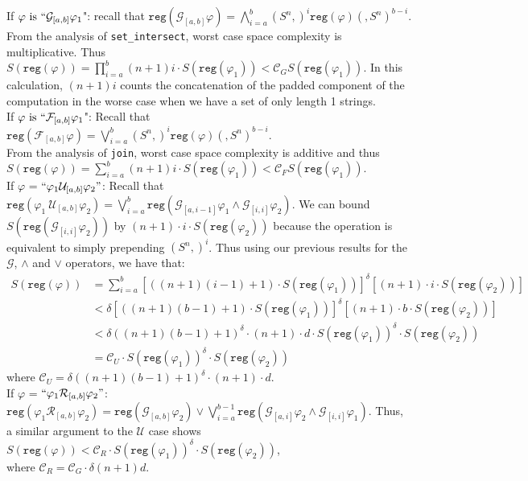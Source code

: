 \documentclass[runningheads]{llncs}
\renewcommand{\phi}{\varphi}
\begin{document}
\begin{flushleft}
\hspace{3mm} If $\phi \text{ is } ``\mathcal{G}_{[a,b]} \phi_{1}$":
recall that $\texttt{reg}(\mathcal{G}_{[a,b]} \phi) = \bigwedge_{i=a}^{b} (S^n,)^i \texttt{reg}(\phi) (,S^n)^{b-i}$.
From the analysis of \texttt{set\_intersect}, worst case space complexity is multiplicative. Thus\\ $S(\texttt{reg}(\phi)) = \prod_{i=a}^{b} (n+1)i \cdot S(\texttt{reg}(\phi_{1})) < \mathcal{C}_G S(\texttt{reg}(\phi_1))$.
In this calculation, $(n+1)i$ counts the concatenation of the padded component of the computation in the worse case when we have a set of only length 1 strings. \\
\hspace{3mm} If $\phi \text{ is } ``\mathcal{F}_{[a,b]} \phi_{1}$":
Recall that $\texttt{reg}(\mathcal{F}_{[a,b]} \phi) = \bigvee_{i=a}^{b} (S^n,)^i \texttt{reg}(\phi)(,S^n)^{b-i}$. \\
From the analysis of \texttt{join}, worst case space complexity is additive and thus 
$S(\texttt{reg}(\phi)) = \sum_{i=a}^{b} (n+1)i \cdot S(\texttt{reg}(\phi_{1})) < \mathcal{C}_{F} S(\texttt{reg}(\phi_1))$.\\
\hspace{3mm}If $\phi$ = $``\phi_1 \mathcal{U}_{[a, b]} \phi_2"$: Recall that
    $\texttt{reg}(\phi_1 \ \mathcal{U}_{[a,b]} \phi_2) =  \bigvee_{i=a}^{b} \texttt{reg}\left(\mathcal{G}_{[a,i-1]}\phi_1 \land \mathcal{G}_{[i, i]} \phi_2\right)$.
    We can bound $S(\texttt{reg}(\mathcal{G}_{[i, i]} \phi_2))$ by $(n+1) \cdot i \cdot S(\texttt{reg}(\phi_2))$ because the operation is equivalent to simply prepending $(S^n ,)^i$.
    Thus using our previous results for the $\mathcal{G}$, $\land$ and $\lor$ operators, we have that:
    \vspace{-.4cm}
    \begin{align*}
        S(\texttt{reg}(\phi)) &= 
        \sum_{i = a}^b [((n+1)(i-1) + 1) \cdot S(\texttt{reg}(\phi_1))]^\delta 
        [(n+1) \cdot i \cdot S(\texttt{reg}(\phi_2))] \\
        &< \delta [((n+1)(b-1) + 1) \cdot S(\texttt{reg}(\phi_1))]^\delta 
        [(n+1) \cdot b \cdot S(\texttt{reg}(\phi_2))] \\
        &< \delta ((n+1)(b-1) + 1)^\delta \cdot (n+1) \cdot d \cdot S(\texttt{reg}(\phi_1))^\delta \cdot S(\texttt{reg}(\phi_2)) \\
        &= \mathcal{C}_U \cdot S(\texttt{reg}(\phi_1))^\delta \cdot S(\texttt{reg}(\phi_2))
    \end{align*}
    where $\mathcal{C}_U = \delta ((n+1)(b-1) + 1)^\delta \cdot (n+1) \cdot d$.\\
\hspace{3mm} If $\phi$ = $``\phi_1 \mathcal{R}_{[a, b]} \phi_2"$:
    $\texttt{reg}(\phi_1 \mathcal{R}_{[a,b]} \phi_2) =  \texttt{reg}\left(\mathcal{G}_{[a,b]}\phi_2\right) \lor \bigvee_{i=a}^{b-1} \texttt{reg}\left(\mathcal{G}_{[a,i]}\phi_2 \land \mathcal{G}_{[i, i]} \phi_1\right)$. Thus, a similar argument to the $\mathcal{U}$ case shows
    $S(\texttt{reg}(\phi)) < \mathcal{C}_R \cdot S(\texttt{reg}(\phi_1))^\delta \cdot S(\texttt{reg}(\phi_2))$, \\
    where $\mathcal{C}_R = \mathcal{C}_G \cdot \delta (n+1)d$.
\end{flushleft}
\end{document}
